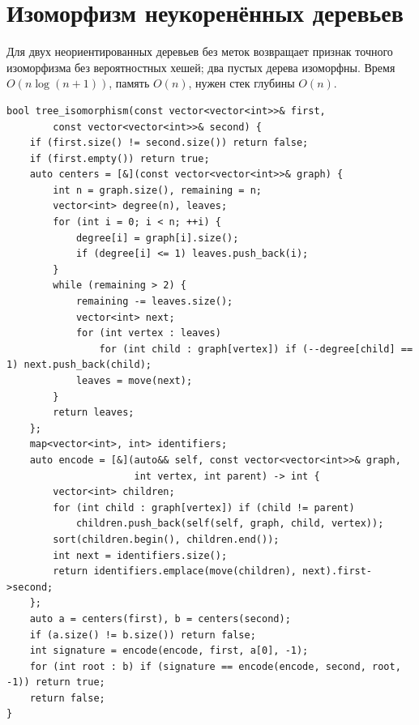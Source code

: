 \section{Изоморфизм неукоренённых деревьев}
Для двух неориентированных деревьев без меток возвращает признак точного изоморфизма без вероятностных хешей; два пустых дерева изоморфны.
Время $O(n\log(n+1))$, память $O(n)$, нужен стек глубины $O(n)$.
\begin{lstlisting}[name=tree_isomorphism]
bool tree_isomorphism(const vector<vector<int>>& first,
        const vector<vector<int>>& second) {
    if (first.size() != second.size()) return false;
    if (first.empty()) return true;
    auto centers = [&](const vector<vector<int>>& graph) {
        int n = graph.size(), remaining = n;
        vector<int> degree(n), leaves;
        for (int i = 0; i < n; ++i) {
            degree[i] = graph[i].size();
            if (degree[i] <= 1) leaves.push_back(i);
        }
        while (remaining > 2) {
            remaining -= leaves.size();
            vector<int> next;
            for (int vertex : leaves)
                for (int child : graph[vertex]) if (--degree[child] == 1) next.push_back(child);
            leaves = move(next);
        }
        return leaves;
    };
    map<vector<int>, int> identifiers;
    auto encode = [&](auto&& self, const vector<vector<int>>& graph,
                      int vertex, int parent) -> int {
        vector<int> children;
        for (int child : graph[vertex]) if (child != parent)
            children.push_back(self(self, graph, child, vertex));
        sort(children.begin(), children.end());
        int next = identifiers.size();
        return identifiers.emplace(move(children), next).first->second;
    };
    auto a = centers(first), b = centers(second);
    if (a.size() != b.size()) return false;
    int signature = encode(encode, first, a[0], -1);
    for (int root : b) if (signature == encode(encode, second, root, -1)) return true;
    return false;
}
\end{lstlisting}
%

